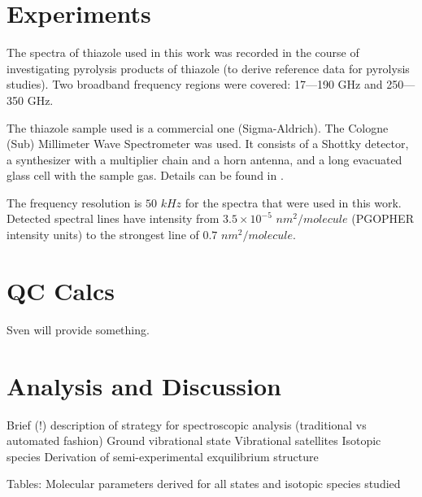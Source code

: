 \documentclass[a4paper]{article}
\begin{document}
\section{Experiments}

The spectra of thiazole used in this work was recorded in the course of investigating pyrolysis products of thiazole (to derive reference data for pyrolysis studies). Two  broadband frequency regions were covered: 17—190 GHz and 250—350 GHz. 

The thiazole sample used is a commercial one (Sigma-Aldrich). The Cologne (Sub) Millimeter Wave Spectrometer was used. It consists of a Shottky detector, a synthesizer with a multiplier chain and a horn antenna, and a long evacuated glass cell with the sample gas. Details can be found in \cite{martin2015millimeter}.

The frequency resolution is $50$ $kHz$ for the spectra that were used in this work. Detected spectral lines have intensity from $3.5 \times 10^{-5}$ $nm^2/molecule$ (PGOPHER intensity units) to the strongest line of $0.7$ $nm^2/molecule$.

\section{QC Calcs}

Sven will provide something.

\section{Analysis and Discussion}

Brief (!) description of strategy for spectroscopic analysis (traditional vs automated fashion)
Ground vibrational state
Vibrational satellites
Isotopic species
Derivation of semi-experimental exquilibrium structure

Tables: Molecular parameters derived for all states and isotopic species studied
\end{document}
